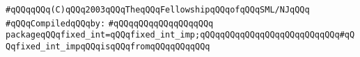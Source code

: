 \label{src/lib/std/fixed-int.pkg}
\verb|#qQQqqQQq(C)qQQq2003qQQqTheqQQqFellowshipqQQqofqQQqSML/NJqQQq|\newline
\newline
\verb|#qQQqCompiledqQQqby:|\newline
\verb|#qQQqqQQqqQQqqQQqqQQq|\newline
\newline
\verb|packageqQQqfixed_int=qQQqfixed_int_imp;qQQqqQQqqQQqqQQqqQQqqQQqqQQq#qQQqfixed_int_impqQQqisqQQqfromqQQqqQQqqQQq|\newline

